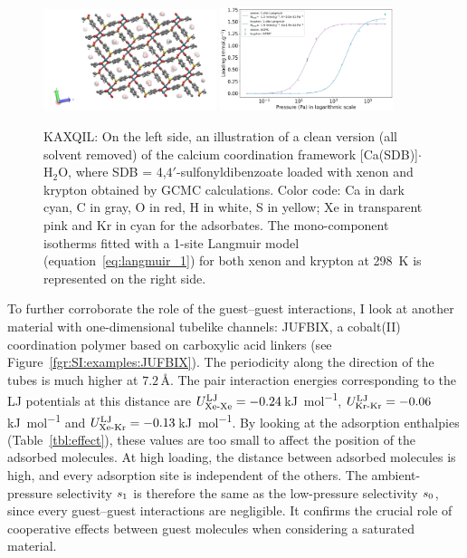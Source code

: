 \documentclass[main.tex]{subfiles}
\begin{document}
\begin{figure}[ht]
  \centering
    \includegraphics[width=0.45\textwidth]{figures/2-thermo/KAXQIL_clean.jpg}
    \includegraphics[width=0.45\textwidth]{figures/2-thermo/KAXQIL_clean_isotherm_xenon_krypton_298K.jpg}
    \caption{KAXQIL: On the left side, an illustration of a clean version (all solvent removed) of the calcium coordination framework [Ca(SDB)]$\cdot$H$_2$O, where SDB = 4,$4'$-sulfonyldibenzoate loaded with xenon and krypton obtained by GCMC calculations. Color code: Ca in dark cyan, C in gray, O in red, H in white, S in yellow; Xe in transparent pink and Kr in cyan for the adsorbates. The mono-component isotherms fitted with a 1-site Langmuir model (equation~\ref{eq:langmuir_1}) for both xenon and krypton at \SI{298}{\kelvin} is represented on the right side.}\label{fgr:SI:examples:KAXQIL}
  \end{figure}

To further corroborate the role of the guest--guest interactions, I look at another material with one-dimensional tubelike channels: JUFBIX, a cobalt(II) coordination polymer based on carboxylic acid linkers (see Figure~\ref{fgr:SI:examples:JUFBIX}).\autocite{JUFBIX} The periodicity along the direction of the tubes is much higher at $7.2$\,\si{\angstrom}. The pair interaction energies corresponding to the LJ potentials at this distance are $U^{\text{LJ}}_{\text{Xe-Xe}}=-0.24$\,\si{\kilo\joule\per\mol}, $U^{\text{LJ}}_{\text{Kr-Kr}}=-0.06$\,\si{\kilo\joule\per\mol} and $U^{\text{LJ}}_{\text{Xe-Kr}}=-0.13$\,\si{\kilo\joule\per\mol}. By looking at the adsorption enthalpies (Table~\ref{tbl:effect}), these values are too small to affect the position of the adsorbed molecules. At high loading, the distance between adsorbed molecules is high, and every adsorption site is independent of the others. The ambient-pressure selectivity $s_{\text{1}}$ is therefore the same as the low-pressure selectivity $s_{\text{0}}$, since every guest--guest interactions are negligible. It confirms the crucial role of cooperative effects between guest molecules when considering a saturated material.
\end{document}
